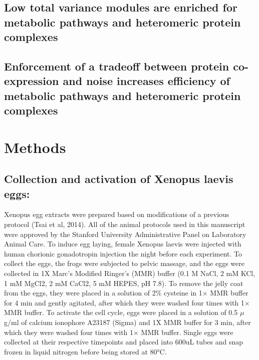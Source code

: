 \documentclass[11pt,twocolumn]{article}
\begin{document}
\hypertarget{low-total-variance-modules-are-enriched-for-metabolic-pathways-and-heteromeric-protein-complexes}{%
\subsection{Low total variance modules are enriched for metabolic
pathways and heteromeric protein
complexes}\label{low-total-variance-modules-are-enriched-for-metabolic-pathways-and-heteromeric-protein-complexes}}

\hypertarget{enforcement-of-a-tradeoff-between-protein-co-expression-and-noise-increases-efficiency-of-metabolic-pathways-and-heteromeric-protein-complexes}{%
\subsection{Enforcement of a tradeoff between protein co-expression and
noise increases efficiency of metabolic pathways and heteromeric protein
complexes}\label{enforcement-of-a-tradeoff-between-protein-co-expression-and-noise-increases-efficiency-of-metabolic-pathways-and-heteromeric-protein-complexes}}

\hypertarget{methods}{%
\section{Methods}\label{methods}}

\hypertarget{collection-and-activation-of-xenopus-laevis-eggs}{%
\subsection{Collection and activation of Xenopus laevis
eggs:}\label{collection-and-activation-of-xenopus-laevis-eggs}}

Xenopus egg extracts were prepared based on modifications of a previous
protocol (Tsai et al, 2014). All of the animal protocols used in this
manuscript were approved by the Stanford University Administrative Panel
on Laboratory Animal Care. To induce egg laying, female Xenopus laevis
were injected with human chorionic gonadotropin injection the night
before each experiment. To collect the eggs, the frogs were subjected to
pelvic massage, and the eggs were collected in 1X Marc's Modified
Ringer's (MMR) buffer (0.1 M NaCl, 2 mM KCl, 1 mM MgCl2, 2 mM CaCl2, 5
mM HEPES, pH 7.8). To remove the jelly coat from the eggs, they were
placed in a solution of 2\% cysteine in 1× MMR buffer for 4 min and
gently agitated, after which they were washed four times with 1× MMR
buffer. To activate the cell cycle, eggs were placed in a solution of
0.5 \(\mu\)g/ml of calcium ionophore A23187 (Sigma) and 1X MMR buffer
for 3 min, after which they were washed four times with 1× MMR buffer.
Single eggs were collected at their respective timepoints and placed
into 600uL tubes and snap frozen in liquid nitrogen before being stored
at 80°C.
\end{document}

